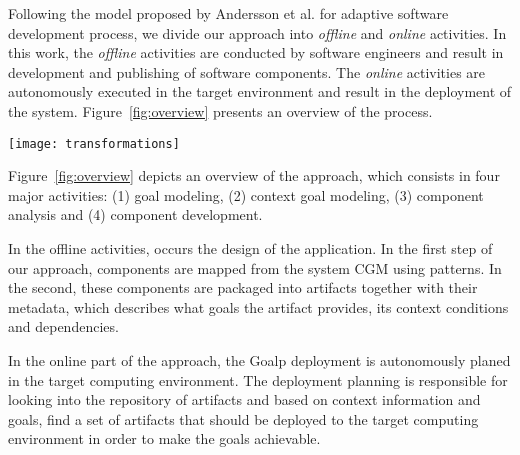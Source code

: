 \label{sec:proposal}




Following the model proposed by Andersson et al.\cite{andersson_software_2013} for adaptive software development process, we divide our approach into \emph{offline} and \emph{online} activities. In this work, the \emph{offline} activities are conducted by software engineers and result in development and publishing of software components. The \emph{online} activities are autonomously executed in the target environment and result in the deployment of the system. Figure~\ref{fig:overview} presents an overview of the process.

\begin{figure*}[!htb]
  \centering
  \texttt{[image: transformations]}
  \caption{Overview}
\label{fig:overview}
\end{figure*}

Figure~\ref{fig:overview} depicts an overview of the approach, which consists in four major activities: (1) goal modeling, (2) context goal modeling, (3) component analysis and (4) component development.

In the offline activities, occurs the design of the application. In the first step of our approach, components are mapped from the system CGM using patterns. In the second, these components are packaged into artifacts together with their metadata, which describes what goals the artifact provides, its context conditions and dependencies.

In the online part of the approach, the Goalp deployment is autonomously planed in the target computing environment.
The deployment planning is responsible for looking into the repository of artifacts and based on context information and goals, find a set of artifacts that should be deployed to the target computing environment in order to make the goals achievable.

